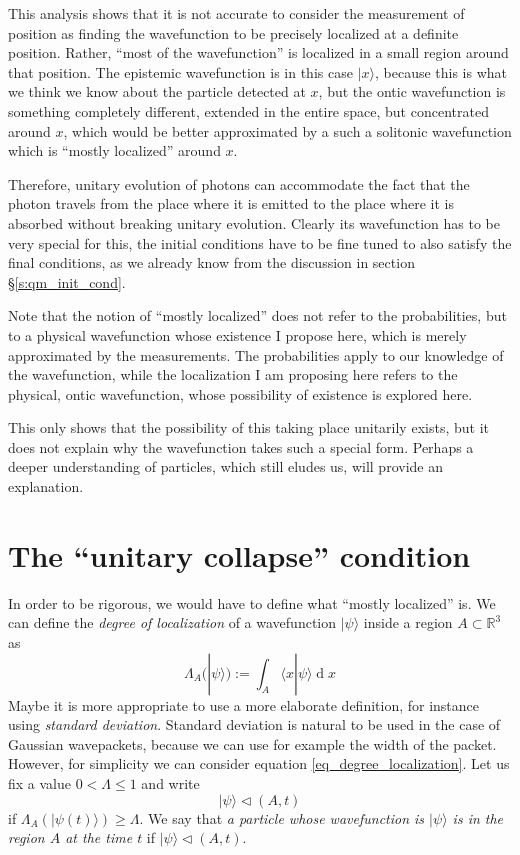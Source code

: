 \documentclass[11pt]{amsart}
\theoremstyle{definition}
\theoremstyle{plain}
\begin{document}
This analysis shows that it is not accurate to consider the measurement of position as finding the wavefunction to be precisely localized at a definite position. Rather, ``most of the wavefunction'' is localized in a small region around that position. The epistemic wavefunction is in this case $|{x}\rangle$, because this is what we think we know about the particle detected at $x$, but the ontic wavefunction is something completely different, extended in the entire space, but concentrated around $x$, which would be better approximated by a such a solitonic wavefunction which is ``mostly localized'' around $x$.

Therefore, unitary evolution of photons can accommodate the fact that the photon travels from the place where it is emitted to the place where it is absorbed without breaking unitary evolution. Clearly its wavefunction has to be very special for this, the initial conditions have to be fine tuned to also satisfy the final conditions, as we already know from the discussion in section \S\ref{s:qm_init_cond}.

Note that the notion of ``mostly localized'' does not refer to the probabilities, but to a physical wavefunction whose existence I propose here, which is merely approximated by the measurements. The probabilities apply to our knowledge of the wavefunction, while the localization I am proposing here refers to the physical, ontic wavefunction, whose possibility of existence is explored here.

This only shows that the possibility of this taking place unitarily exists, but it does not explain why the wavefunction takes such a special form. Perhaps a deeper understanding of particles, which still eludes us, will provide an explanation.


\section{The ``unitary collapse'' condition}
\label{s:unitary_collapse_condition}

In order to be rigorous, we would have to define what ``mostly localized'' is. We can define the \emph{degree of localization} of a wavefunction $|{\psi}\rangle$ inside a region $A\subset\mathbb{R}^3$ as
\begin{equation}
\label{eq_degree_localization}
\Lambda_A(|{\psi}\rangle):=\int_{A}\langle{x}|{\psi}\rangle\operatorname{d} x
\end{equation}
Maybe it is more appropriate to use a more elaborate definition, for instance using \emph{standard deviation}. Standard deviation is natural to be used in the case of Gaussian wavepackets, because we can use for example the width of the packet. However, for simplicity we can consider equation \eqref{eq_degree_localization}. Let us fix a value $0<\Lambda \leq 1$ and write
\begin{equation}
\label{eq_localization_region}
|{\psi}\rangle\triangleleft(A,t)
\end{equation}
if $\Lambda_A(|{\psi(t)}\rangle)\geq \Lambda$.
We say that \emph{a particle whose wavefunction is $|{\psi}\rangle$ is in the region $A$ at the time $t$} if $|{\psi}\rangle\triangleleft(A,t)$.
\end{document}
